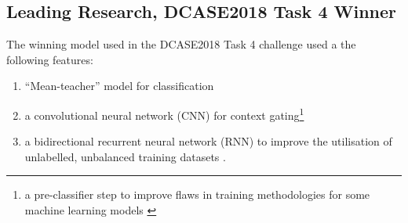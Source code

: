 \documentclass{UoNMCHA}
\newcommand{\citationneeded}{\textsuperscript{\color{blue} [citation needed]}}
\newcommand{\tref}[1] {Table \ref{#1}}
\numberwithin{equation}{section}
\begin{document}
\subsection{Leading Research, DCASE2018 Task 4 Winner}
The winning model used in the DCASE2018 Task 4 challenge used a the following features: %
\begin{enumerate}
    \item “Mean-teacher” model for classification
    \item a convolutional neural network (CNN) for context gating\footnote{a pre-classifier step to improve flaws in training methodologies for some machine learning models \cite{Yan16}}\cite{Yan16}
    \item a bidirectional recurrent neural network (RNN) to improve the utilisation of unlabelled, unbalanced training datasets \cite{Lu2018}. 
\end{enumerate}








\end{document}

